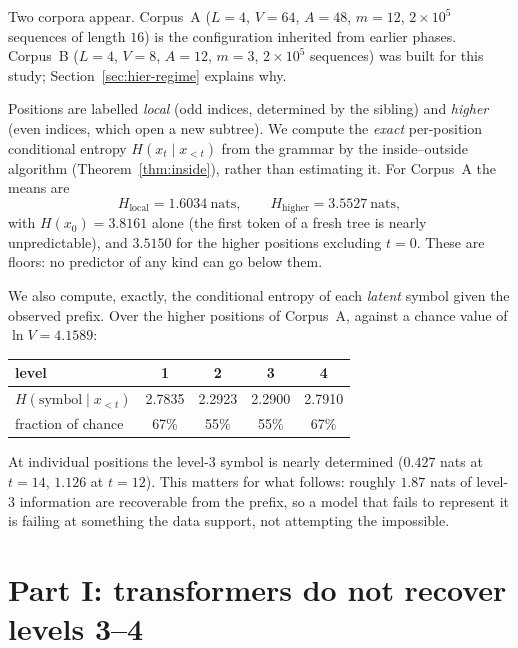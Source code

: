 \documentclass[11pt,a4paper]{article}
\theoremstyle{plain}
\theoremstyle{definition}
\begin{document}
Two corpora appear. Corpus~A ($L=4$, $V=64$, $A=48$, $m=12$, $2\times10^5$
sequences of length $16$) is the configuration inherited from earlier phases.
Corpus~B ($L=4$, $V=8$, $A=12$, $m=3$, $2\times10^5$ sequences) was built for
this study; Section~\ref{sec:hier-regime} explains why.

Positions are labelled \emph{local} (odd indices, determined by the sibling)
and \emph{higher} (even indices, which open a new subtree). We compute the
\emph{exact} per-position conditional entropy $H(x_t \mid x_{<t})$ from the
grammar by the inside--outside algorithm (Theorem~\ref{thm:inside}), rather
than estimating it. For Corpus~A the means are
\begin{equation}
  H_{\mathrm{local}} = 1.6034 \ \text{nats}, \qquad
  H_{\mathrm{higher}} = 3.5527 \ \text{nats},
  \label{eq:floorsA}
\end{equation}
with $H(x_0)=3.8161$ alone (the first token of a fresh tree is nearly
unpredictable), and $3.5150$ for the higher positions excluding $t=0$. These
are floors: no predictor of any kind can go below them.

We also compute, exactly, the conditional entropy of each \emph{latent} symbol
given the observed prefix. Over the higher positions of Corpus~A, against a
chance value of $\ln V = 4.1589$:

\begin{center}
\begin{tabular}{lcccc}
\toprule
level & 1 & 2 & 3 & 4 \\
\midrule
$H(\text{symbol} \mid x_{<t})$ & 2.7835 & 2.2923 & 2.2900 & 2.7910 \\
fraction of chance & 67\% & 55\% & 55\% & 67\% \\
\bottomrule
\end{tabular}
\end{center}

\noindent
At individual positions the level-3 symbol is nearly determined ($0.427$ nats
at $t=14$, $1.126$ at $t=12$). This matters for what follows: roughly $1.87$
nats of level-3 information are recoverable from the prefix, so a model that
fails to represent it is failing at something the data support, not attempting
the impossible.


\section{Part I: transformers do not recover levels 3--4}
\label{sec:hier-transformer}
\end{document}
